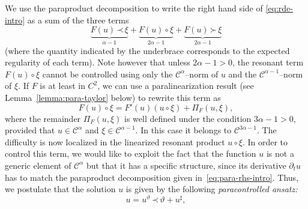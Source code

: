 \documentclass[a4paper,11pt]{article}
\newcommand{\tmtextit}[1]{{\itshape{#1}}}
\theoremstyle{remark}
\newcommand{\CC}{\ensuremath{\mathscr{C}}}
\newcommand{\lpara}{\,\mathord{\prec}\,}
\newcommand{\rpara}{\,\mathord{\succ}\,}
\newcommand{\reso}{\,\mathord{\circ}\,}
\begin{document}
We use the paraproduct decomposition to write the right hand side of {\eqref{eq:rde-intro}} as a
sum of the three terms
\begin{equation}\label{eq:para-rhs-intro}
  \underbrace{F ( u ) \lpara \xi}_{\alpha -1} + \underbrace{F ( u ) \reso  \xi}_{2 \alpha -1} + \underbrace{F ( u ) \rpara \xi}_{2 \alpha -1}
\end{equation}
(where the quantity indicated by the underbrace corresponds to the expected regularity of each term). Note however that unless $2 \alpha -1>0$, the resonant term
$F ( u ) \reso   \xi$ cannot be controlled using only the $\CC^{\alpha}$--norm
of $u$ and the $\CC^{\alpha -1}$--norm of $\xi$. If $F$ is at least in $C^2$, we can use a paralinearization result (see Lemma~\ref{lemma:para-taylor} below) to rewrite this term as
\begin{equation}\label{eq:rde expand Fu}
   F ( u ) \reso \xi =F' ( u )  ( u \reso \xi ) + \Pi_{F} ( u, \xi ),
\end{equation}
where the remainder $\Pi_{F} ( u, \xi )$ is well defined under the condition
$3 \alpha -1>0$, provided that $u \in \CC^{\alpha}$ and $\xi \in \CC^{\alpha -1}$. In this case it belongs to $\CC^{3 \alpha -1}$. The
difficulty is now localized in the linearized resonant product $u \reso \xi$. In order to control this term, we would like to exploit the fact that
the function $u$ is not a generic element of $\CC^{\alpha}$ but that it has a
specific structure, since its derivative $\partial_{t} u$ has to match the
paraproduct decomposition given in~\eqref{eq:para-rhs-intro}. Thus, we postulate
that the solution $u$ is given by the following \tmtextit{paracontrolled ansatz:}
\begin{equation}\label{eq:paracontrolled ansatz}
   u=u^{\vartheta} \lpara \vartheta +u^{\sharp},
\end{equation}
\end{document}
